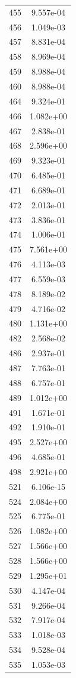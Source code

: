 \documentclass[12pt]{article}
\begin{document}
\begin{longtable}{@{}cc@{}}
455 & 9.557e-04 \\
456 & 1.049e-03 \\
457 & 8.831e-04 \\
458 & 8.969e-04 \\
459 & 8.988e-04 \\
460 & 8.988e-04 \\
464 & 9.324e-01 \\
466 & 1.082e+00 \\
467 & 2.838e-01 \\
468 & 2.596e+00 \\
469 & 9.323e-01 \\
470 & 6.485e-01 \\
471 & 6.689e-01 \\
472 & 2.013e-01 \\
473 & 3.836e-01 \\
474 & 1.006e-01 \\
475 & 7.561e+00 \\
476 & 4.113e-03 \\
477 & 6.559e-03 \\
478 & 8.189e-02 \\
479 & 4.716e-02 \\
480 & 1.131e+00 \\
482 & 2.568e-02 \\
486 & 2.937e-01 \\
487 & 7.763e-01 \\
488 & 6.757e-01 \\
489 & 1.012e+00 \\
491 & 1.671e-01 \\
492 & 1.910e-01 \\
495 & 2.527e+00 \\
496 & 4.685e-01 \\
498 & 2.921e+00 \\
521 & 6.106e-15 \\
524 & 2.084e+00 \\
525 & 6.775e-01 \\
526 & 1.082e+00 \\
527 & 1.566e+00 \\
528 & 1.566e+00 \\
529 & 1.295e+01 \\
530 & 4.147e-04 \\
531 & 9.266e-04 \\
532 & 7.917e-04 \\
533 & 1.018e-03 \\
534 & 9.528e-04 \\
535 & 1.053e-03 \\

\end{longtable}
\end{document}
